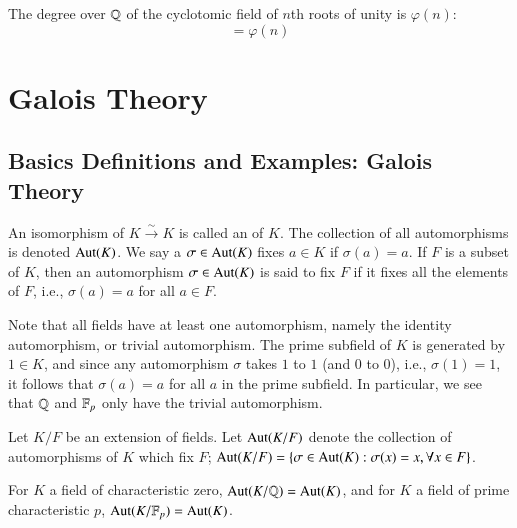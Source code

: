 \documentclass[12pt, a4paper, oneside, openright, titlepage]{book}
\begin{document}
\begin{cor}
    The degree over $\mathbb Q$ of the cyclotomic field of $n$th roots of unity is $\varphi(n)$: \begin{equation*}
        [\Q(\zeta_n):\Q] = \varphi(n)
    \end{equation*}
\end{cor}







\chapter{\textsection\textsection Galois Theory}


\section{\textsection Basics Definitions and Examples: Galois Theory}


\begin{defn}
    An isomorphism of $K\xrightarrow{\sim} K$ is called an  of $K$. The collection of all automorphisms is denoted $\operatorname{Aut}(K)$. We say a $\sigma \in \operatorname{Aut}(K)$ fixes $a \in K$ if $\sigma(a) = a$. If $F$ is a subset of $K$, then an automorphism $\sigma \in \operatorname{Aut}(K)$ is said to fix $F$ if it fixes all the elements of $F$, i.e., $\sigma(a) =a$ for all $a \in F$.
\end{defn}

Note that all fields have at least one automorphism, namely the identity automorphism, or trivial automorphism. The prime subfield of $K$ is generated by $1 \in K$, and since any automorphism $\sigma$ takes $1$ to $1$ (and $0$ to $0$), i.e., $\sigma(1) = 1$, it follows that $\sigma(a) = a$ for all $a$ in the prime subfield. In particular, we see that $\mathbb Q$ and $\mathbb F_p$ only have the trivial automorphism.

\begin{defn}
    Let $K/F$ be an extension of fields. Let $\operatorname{Aut}(K/F)$ denote the collection of automorphisms of $K$ which fix $F$; $\operatorname{Aut}(K/F) = \{\sigma \in \operatorname{Aut}(K):\sigma(x) = x,\forall x \in F\}$.
\end{defn}

\begin{eg}
    For $K$ a field of characteristic zero, $\operatorname{Aut}(K/\mathbb Q) = \operatorname{Aut}(K)$, and for $K$ a field of prime characteristic $p$, $\operatorname{Aut}(K/\mathbb F_p) = \operatorname{Aut}(K)$.
\end{eg}
\end{document}
